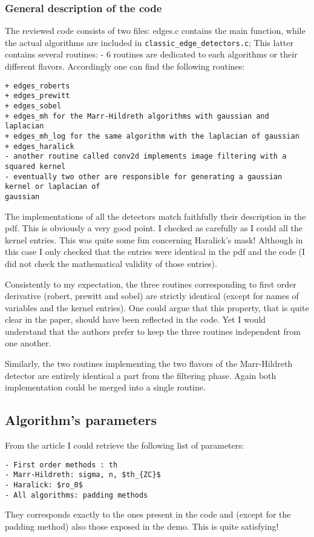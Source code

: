 \documentclass[a4paper,10pt]{report}
\begin{document}
\subsubsection{General description of the code}
The reviewed code consists of two files: edges.c contains the main function,
while the actual algorithms are included in \verb+classic_edge_detectors.c+; This
latter contains several routines:
- 6 routines are dedicated to each algorithms or their different flavors.
Accordingly one can find the following routines:
\begin{verbatim}
+ edges_roberts
+ edges_prewitt
+ edges_sobel
+ edges_mh for the Marr-Hildreth algorithms with gaussian and laplacian
+ edges_mh_log for the same algorithm with the laplacian of gaussian
+ edges_haralick
- another routine called conv2d implements image filtering with a squared kernel
- eventually two other are responsible for generating a gaussian kernel or laplacian of
gaussian
\end{verbatim}


The implementations of all the detectors match faithfully their description in
the pdf. This is obviously a very good point. I checked as carefully as I could
all the kernel entries. This was quite some fun concerning Haralick's mask!
Although in this case I only checked that the entries were identical in the pdf
and the code (I did not check the mathematical validity of those entries).

Consistently to my expectation, the three routines corresponding to first order
derivative (robert, prewitt and sobel) are strictly identical (except for
names of variables and the kernel entries). One could argue that this property,
that is quite clear in the paper, should have been reflected in the code. Yet I
would understand that the authors prefer to keep the three routines independent
from one another.

Similarly, the two routines implementing the two flavors of the Marr-Hildreth
detector are entirely identical a part from the filtering phase. Again both
implementation could be merged into a single routine.

\subsection{ Algorithm's parameters}
From the article I could retrieve the following list of parameters:
\begin{verbatim}
- First order methods : th
- Marr-Hildreth: sigma, n, $th_{ZC}$
- Haralick: $ro_0$
- All algorithms: padding methods
\end{verbatim}
They corresponds exactly to the ones present in the code and (except for the
padding method) also those exposed in the demo. This is quite satisfying!
\end{document}
